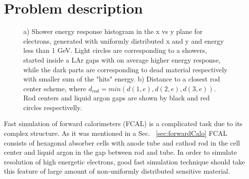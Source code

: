 \section{Problem description}\label{sec:FSproblem}



\begin{figure}[!tbp]
\begin{minipage}[h]{0.49\linewidth}
\end{minipage}
\hfill
\begin{minipage}[h]{0.49\linewidth}
\end{minipage}
\caption{ a) Shower energy response histogram in the x vs y plane for electrons, generated with uniformly distributed x and y and energy less than 1 GeV. Light circles are corresponding to a showers, started inside a LAr gaps with on average higher energy response, while the dark parts are corresponding to dead material respectively with smaller sum of the "hits" energy.
b) Distance to a closest rod center scheme, where $d_{rod} = min( d(1,e), d(2, e), d(3, e))$. Rod centers and liquid argon gaps are shown by black and red circles respectivelly.}
\label{fig:FSFluctuations}
\end{figure}


Fast simulation of forward calorimeters (FCAL) is a complicated task due to its complex structure. As it was mentioned in a Sec. ~\ref{sec:forwardCalo} FCAL consists of hexagonal absorber cells with anode tube and cathod rod in the cell center and liquid argon in the gap between rod and tube. In order to simulate resolution of high energetic electrons, good fast simulation technique should take this feature of large amount of non-uniformly distributed sensitive material.


